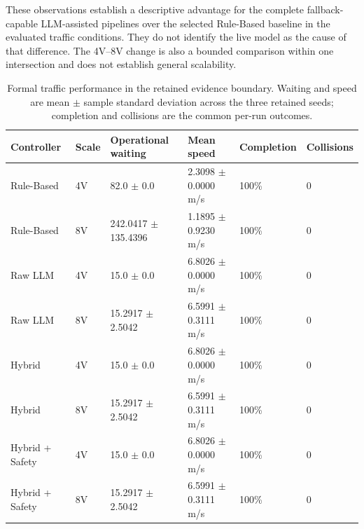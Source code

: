 \documentclass[letterpaper,10pt,conference]{ieeeconf}
\begin{document}
These observations establish a descriptive advantage for the complete fallback-capable LLM-assisted pipelines over the selected Rule-Based baseline in the evaluated traffic conditions. They do not identify the live model as the cause of that difference. The 4V--8V change is also a bounded comparison within one intersection and does not establish general scalability.






\begin{table}[t]

\centering

\caption{Formal traffic performance in the retained evidence boundary. Waiting and speed are mean $\pm$ sample standard deviation across the three retained seeds; completion and collisions are the common per-run outcomes.}

\label{tab:formal_traffic}

\renewcommand{\arraystretch}{1.1}

\begin{tabular}{p{2.75cm} p{0.9cm} p{2.25cm} p{2.05cm} p{1.35cm} p{1.15cm}}

\toprule

\textbf{Controller} & \textbf{Scale} & \textbf{Operational waiting} & \textbf{Mean speed} & \textbf{Completion} & \textbf{Collisions} \\

\midrule

Rule-Based & 4V & 82.0 $\pm$ 0.0 & 2.3098 $\pm$ 0.0000 m/s & 100\% & 0 \\

Rule-Based & 8V & 242.0417 $\pm$ 135.4396 & 1.1895 $\pm$ 0.9230 m/s & 100\% & 0 \\

Raw LLM & 4V & 15.0 $\pm$ 0.0 & 6.8026 $\pm$ 0.0000 m/s & 100\% & 0 \\

Raw LLM & 8V & 15.2917 $\pm$ 2.5042 & 6.5991 $\pm$ 0.3111 m/s & 100\% & 0 \\

Hybrid & 4V & 15.0 $\pm$ 0.0 & 6.8026 $\pm$ 0.0000 m/s & 100\% & 0 \\

Hybrid & 8V & 15.2917 $\pm$ 2.5042 & 6.5991 $\pm$ 0.3111 m/s & 100\% & 0 \\

Hybrid + Safety & 4V & 15.0 $\pm$ 0.0 & 6.8026 $\pm$ 0.0000 m/s & 100\% & 0 \\

Hybrid + Safety & 8V & 15.2917 $\pm$ 2.5042 & 6.5991 $\pm$ 0.3111 m/s & 100\% & 0 \\

\bottomrule

\end{tabular}

\end{table}
\end{document}
